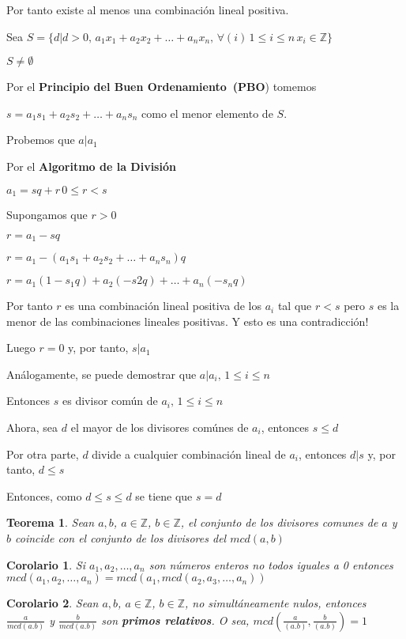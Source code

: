 \documentclass[a4paper,1pt]{report}
\newtheorem*{teo}{Teorema}
\newtheorem*{cor}{Corolario}
\begin{document}
Por tanto existe al menos una combinación lineal positiva.

Sea $S=\{d|d>0,\, a_1x_1+a_2x_2+\dots+a_nx_n,\, \forall (i)\, 1\leq i \leq n\, x_i\in\mathbb{Z}\}$

$S\neq \emptyset$

Por el \textbf{Principio del Buen Ordenamiento~(PBO}) tomemos 

$s=a_1s_1+a_2s_2+\dots+a_ns_n$ como el menor elemento de $S$.

Probemos que $a|a_1$

Por el \textbf{Algoritmo de la División}

$a_1=sq+r\, 0\leq r < s$ 

Supongamos que $r>0$

$r=a_1-sq$

$r=a_1 - (a_1s_1+a_2s_2+\dots+a_ns_n)q$

$r=a_1(1-s_1q)+a_2(-s2q)+\dots+a_n(-s_nq)$

Por tanto $r$ es una combinación lineal positiva de los $a_i$ tal que $r<s$ pero $s$ es la menor de las combinaciones lineales positivas. Y esto es una contradicción! 

Luego $r=0$ y, por tanto, $s|a_1$

Análogamente, se puede demostrar que $a|a_i,\, 1\leq i \leq n$

Entonces $s$ es divisor común de $a_i,\, 1\leq i \leq n$

Ahora, sea $d$ el mayor de los divisores comúnes de $a_i$, entonces $s\leq d$

Por otra parte, $d$ divide a cualquier combinación lineal de $a_i$, entonces $d|s$ y, por tanto, $d\leq s$

Entonces, como $d\leq s \leq d$ se tiene que $s=d$

\begin{teo}
 Sean $a,b$, $a\in\mathbb{Z}$, $b\in\mathbb{Z}$, el conjunto de los divisores comunes de $a$ y $b$ coincide con el conjunto de los divisores del $mcd(a,b)$
\end{teo}

\begin{cor}
 Si $a_1,a_2,\dots,a_n$ son números enteros no todos iguales a 0 entonces $mcd(a_1,a_2,\dots,a_n)=mcd(a_1,mcd(a_2,a_3,\dots,a_n))$
\end{cor}

\begin{cor}
 Sean $a,b$, $a\in\mathbb{Z}$, $b\in\mathbb{Z}$, no simultáneamente nulos, entonces $\frac{a}{mcd(a.b)}$ y  $\frac{b}{mcd(a.b)}$ son \textbf{primos relativos}. O sea, $mcd(\frac{a}{(a.b)},\frac{b}{(a.b)})=1$
\end{cor}
\end{document}
